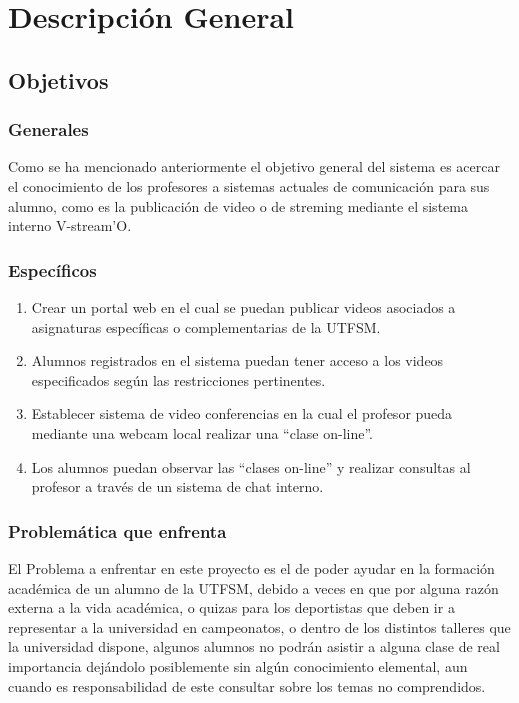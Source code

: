 \documentclass[12pt]{article}
\begin{document}
\newpage
\section{Descripción General}

\subsection{Objetivos}
\subsubsection{Generales}
Como se ha mencionado anteriormente el objetivo general del sistema es acercar el conocimiento de los 
profesores a sistemas actuales de comunicación para sus alumno, como es la publicación de video o de streming
mediante el sistema interno V-stream'O.
\subsubsection{Específicos}
\begin{enumerate}
\item Crear un portal web en el cual se puedan publicar videos asociados a asignaturas específicas o 
complementarias de la UTFSM.
\item Alumnos registrados en el sistema puedan tener acceso a los videos especificados según las
restricciones pertinentes.
\item Establecer sistema de video conferencias en la cual el profesor pueda mediante una webcam local
realizar una ``clase on-line''.
\item Los alumnos puedan observar las ``clases on-line'' y realizar consultas al profesor a través de un 
sistema de chat interno.
\end{enumerate}

\subsubsection{Problemática que enfrenta}
El Problema a enfrentar en este proyecto es el de poder ayudar en la formación académica de un alumno de la 
UTFSM, debido a veces en que por alguna razón externa a la vida académica, o quizas para los
deportistas que deben ir a representar a la universidad en campeonatos, o dentro de los distintos talleres 
que la universidad dispone, algunos alumnos no podrán
asistir a alguna clase de real importancia dejándolo posiblemente sin algún conocimiento elemental, aun
cuando es responsabilidad de este consultar sobre los temas no comprendidos.
\end{document}
